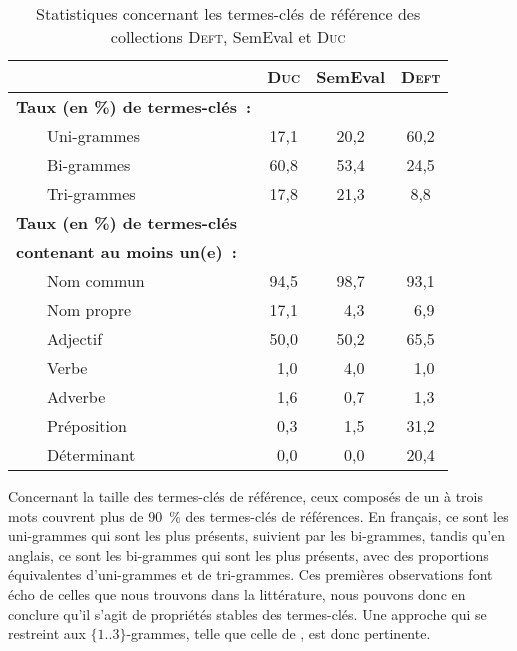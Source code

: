       \begin{table}[!h]
        \centering
        \begin{tabular}{ll|ccc}
          \toprule
          & & \textbf{\textsc{Duc}} & \textbf{SemEval} & \textbf{\textsc{Deft}}\\
          \hline
          \multicolumn{2}{l|}{\textbf{Taux (en \%) de termes-clés~:}}\\
          & Uni-grammes & 17,1 & 20,2 & 60,2\\
          & Bi-grammes & 60,8 & 53,4 & 24,5\\
          & Tri-grammes & 17,8 & 21,3 & 8,8\\
          \hline
          \multicolumn{2}{l|}{\textbf{Taux (en \%) de termes-clés}} & & &\\
          \multicolumn{2}{l|}{\textbf{contenant au moins un(e)~:}} & & &\\
          & Nom commun & 94,5 & 98,7 & 93,1\\
          & Nom propre & 17,1 & $~~$4,3 & $~~$6,9\\
          & Adjectif & 50,0 & 50,2 & 65,5\\
          & Verbe & $~~$1,0 & $~~$4,0 & $~~$1,0\\
          & Adverbe & $~~$1,6 & $~~$0,7 & $~~$1,3\\
          & Préposition & $~~$0,3 & $~~$1,5 & 31,2\\
          & Déterminant & $~~$0,0 & $~~$0,0 & 20,4\\
          \bottomrule
        \end{tabular}
        \caption{Statistiques concernant les termes-clés de référence des
                 collections \textsc{Deft}, SemEval et \textsc{Duc}
                 \label{tab:candidate_selection-train_stats}}
      \end{table}

      Concernant la taille des termes-clés de référence, ceux composés de un à
      trois mots couvrent plus de 90~\% des termes-clés de références. En
      français, ce sont les uni-grammes qui sont les plus présents, suivient par
      les bi-grammes, tandis qu'en anglais, ce sont les bi-grammes qui sont les
      plus présents, avec des proportions équivalentes d'uni-grammes et de
      tri-grammes. Ces premières observations font écho de celles que nous
      trouvons dans la littérature, nous pouvons donc en conclure qu'il s'agit
      de propriétés stables des termes-clés. Une approche qui se restreint aux
      $\{1..3\}$-grammes, telle que celle de , est donc
      pertinente.

